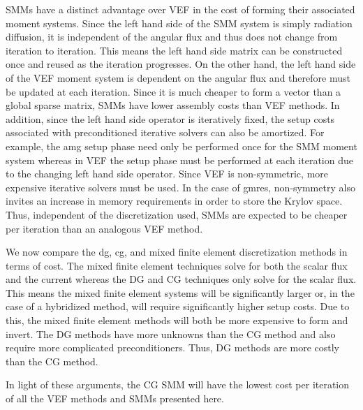 \documentclass[../doc.tex]{subfiles}
\begin{document}
SMMs have a distinct advantage over VEF in the cost of forming their associated moment systems. Since the left hand side of the SMM system is simply radiation diffusion, it is independent of the angular flux and thus does not change from iteration to iteration. This means the left hand side matrix can be constructed once and reused as the iteration progresses. On the other hand, the left hand side of the VEF moment system is dependent on the angular flux and therefore must be updated at each iteration. Since it is much cheaper to form a vector than a global sparse matrix, SMMs have lower assembly costs than VEF methods. In addition, since the left hand side operator is iteratively fixed, the setup costs associated with preconditioned iterative solvers can also be amortized. For example, the \gls{amg} setup phase need only be performed once for the SMM moment system whereas in VEF the setup phase must be performed at each iteration due to the changing left hand side operator. 
Since VEF is non-symmetric, more expensive iterative solvers must be used. In the case of \gls{gmres}, non-symmetry also invites an increase in memory requirements in order to store the Krylov space. Thus, independent of the discretization used, SMMs are expected to be cheaper per iteration than an analogous VEF method. 

We now compare the \gls{dg}, \gls{cg}, and mixed finite element discretization methods in terms of cost. The mixed finite element techniques solve for both the scalar flux and the current whereas the DG and CG techniques only solve for the scalar flux. This means the mixed finite element systems will be significantly larger or, in the case of a hybridized method, will require significantly higher setup costs. Due to this, the mixed finite element methods will both be more expensive to form and invert. The DG methods have more unknowns than the CG method and also require more complicated preconditioners. Thus, DG methods are more costly than the CG method. 

In light of these arguments, the CG SMM will have the lowest cost per iteration of all the VEF methods and SMMs presented here. 
\end{document}
